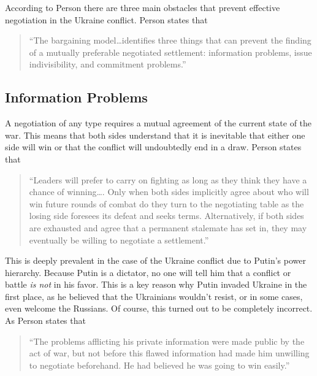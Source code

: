 \documentclass{article}
\begin{document}
    According to Person there are three main obstacles that prevent effective negotiation in the Ukraine conflict. Person states that

    \begin{quote}
        ``The bargaining model\ldots identifies three things that can prevent the finding of a mutually preferable negotiated settlement: information problems, issue indivisibility, and commitment problems.'' ~\parencite{person_2025}
    \end{quote}

    \subsection{Information Problems}
        A negotiation of any type requires a mutual agreement of the current state of the war. This means that both sides understand that it is inevitable that either one side will win or that the conflict will undoubtedly end in a draw. Person states that

        \begin{quote} 
            ``Leaders will prefer to carry on fighting as long as they think they have a chance of winning\ldots. Only when both sides implicitly agree about who will win future rounds of combat do they turn to the negotiating table as the losing side foresees its defeat and seeks terms. Alternatively, if both sides are exhausted and agree that a permanent stalemate has set in, they may eventually be willing to negotiate a settlement.'' \parencite{person_2025}
        \end{quote}

        This is deeply prevalent in the case of the Ukraine conflict due to Putin's power hierarchy. Because Putin is a dictator, no one will tell him that a conflict or battle \textit{is not} in his favor. This is a key reason why Putin invaded Ukraine in the first place, as he believed that the Ukrainians wouldn't resist, or in some cases, even welcome the Russians. Of course, this turned out to be completely incorrect. As Person states that 
        
        \begin{quote}
            ``The problems afflicting his private information were made public by the act of war, but not before this flawed information had made him unwilling to negotiate beforehand. He had believed he was going to win easily.''\parencite{person_2025}
        \end{quote}
        
\end{document}
